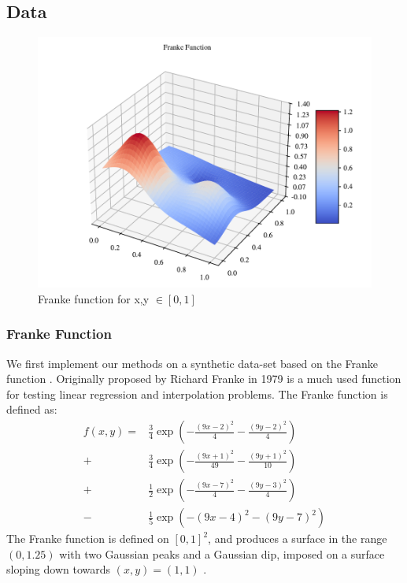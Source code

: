 \subsection{Data}

\begin{figure}[h!]
\centering
\includegraphics[width=1\linewidth]{project_1_alt/figures/data/franke_func.pdf}
\caption{Franke function for x,y $\in [0,1]$}
\label{franke}
\end{figure}

\subsubsection{Franke Function}
We first implement our methods on a synthetic data-set based on the Franke function \citep[p. 13]{frank}. Originally proposed by Richard Franke in 1979 is a much used function for testing linear regression and interpolation problems.
The Franke function is defined as:
\begin{align}\label{eq:franke}
    f(x, y) = &\frac{3}{4} \exp\left( -\frac{(9x - 2)^2}{4} - \frac{(9y - 2)^2}{4} \right) \nonumber \\
    + &\frac{3}{4} \exp\left( -\frac{(9x + 1)^2}{49} - \frac{(9y + 1)^2}{10} \right) \nonumber \\
    + &\frac{1}{2} \exp\left( -\frac{(9x - 7)^2}{4} - \frac{(9y - 3)^2}{4} \right) \nonumber \\
    - &\frac{1}{5} \exp\left( -(9x - 4)^2 - (9y - 7)^2 \right)
\end{align}
The Franke function is defined on $[0, 1]^2$, and produces a surface in the range $(0, 1.25)$ with two Gaussian peaks and a Gaussian dip, imposed on a surface sloping down towards $(x,y)=(1, 1)$ \citep[p. 13]{frank}.


